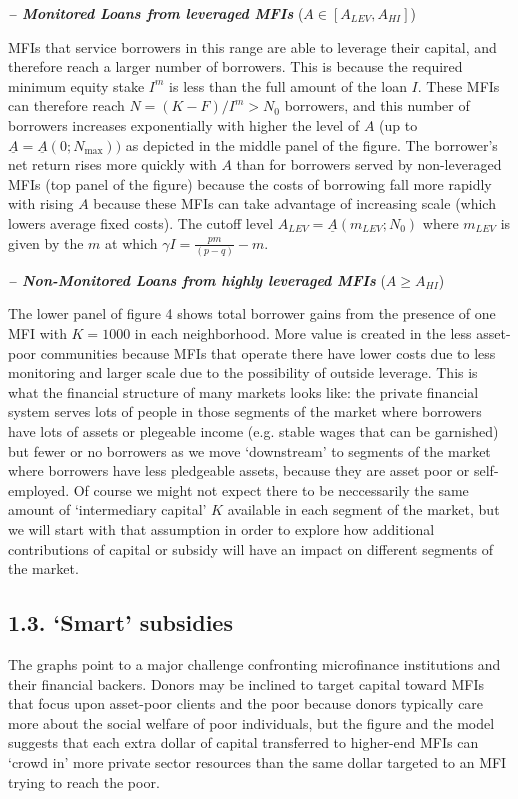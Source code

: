 \documentclass{article} %
\begin{document}
\noindent \textbf{\textit{ -- Monitored Loans from leveraged MFIs}} ($A\in [A_{LEV} ,A_{HI} ]$) 

MFIs that service borrowers in this range are able to leverage their capital, and therefore reach a larger number of borrowers.  This is because the required minimum equity stake $I^{m} $ is less than the full amount of the loan $I.$  These MFIs can therefore reach $N=(K-F)/I^{m} >N_{0} $ borrowers, and this number of borrowers increases exponentially with higher the level of $A$ (up to $\underline{A}=\underline{A}(0;N_{\max } ))$ as depicted in the middle panel of the figure.  The borrower's net return rises more quickly with $A$ than for borrowers served by non-leveraged MFIs (top panel of the figure) because the costs of borrowing fall more rapidly with rising $A$ because these MFIs can take advantage of increasing scale (which lowers average fixed costs).  The cutoff level $A_{LEV} =\underline{A}(m_{LEV} ;N_{0} )$ where $m_{LEV} $ is given by the $m$ at which $\gamma I={\tfrac{pm}{(p-q)}} -m$. 

\noindent \textbf{\textit{ -- Non-Monitored Loans from highly leveraged MFIs}} ($A\ge A_{HI} $) 

The lower panel of figure 4 shows total borrower gains from the presence of one MFI with $K=1000$ in each neighborhood.  More value is created in the less asset-poor communities because MFIs that operate there have lower costs due to less monitoring and larger scale due to the possibility of outside leverage.  This is what the financial structure of many markets looks like:  the private financial system serves lots of people in those segments of the market where borrowers have lots of assets or plegeable income (e.g. stable wages that can be garnished) but fewer or no borrowers as we move `downstream' to segments of the market where borrowers have less pledgeable assets, because they are asset poor or self-employed. Of course we might not expect there to be neccessarily the same amount of `intermediary capital' $K$ available in each segment of the market, but we will start with that assumption in order to explore how additional contributions of capital or subsidy will have an impact on different segments of the market. 

\noindent 
\subsection{1.3.  `Smart' subsidies}

The graphs point to a major challenge confronting microfinance institutions and their financial backers.   Donors may be inclined to target capital toward MFIs that focus upon asset-poor clients and the poor because donors typically care more about the social welfare of poor individuals, but the figure and the model suggests that each extra dollar of capital transferred to higher-end MFIs can `crowd in' more private sector resources than the same dollar targeted to an MFI trying to reach the poor.   
\end{document}
